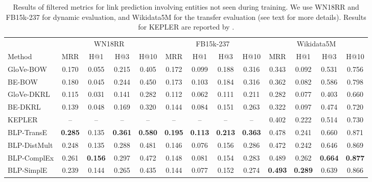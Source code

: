 \documentclass[sigconf]{acmart}
\let\mc\multicolumn
\begin{document}
\begin{table*}
\caption{Results of filtered metrics for link prediction involving entities not seen during training. We use WN18RR and FB15k-237 for dynamic evaluation, and Wikidata5M for the transfer evaluation (see text for more details). Results for KEPLER are reported by \citet{wang2019kepler}.}
\label{tab:results-inductive}
\centering
\begin{tabular}{lcccccccccccc}
\toprule
              &         \mc{4}{c}{WN18RR}                 &        \mc{4}{c}{FB15k-237}               &       \mc{4}{c}{Wikidata5M}               \\ 
                        \cmidrule(lr){2-5}                         \cmidrule(lr){6-9}                          \cmidrule(lr){10-13}                
Method        &    MRR   &     H@1  &     H@3  &     H@10 &    MRR   &     H@1  &     H@3  &     H@10 &    MRR   &     H@1  &     H@3  &     H@10 \\ 
\midrule                                                                                                                                          
GloVe-BOW     &    0.170 &    0.055 &    0.215 &    0.405 &    0.172 &    0.099 &    0.188 &    0.316 &    0.343 &    0.092 &    0.531 &    0.756 \\ 
BE-BOW        &    0.180 &    0.045 &    0.244 &    0.450 &    0.173 &    0.103 &    0.184 &    0.316 &    0.362 &    0.082 &    0.586 &    0.798 \\ 
GloVe-DKRL    &    0.115 &    0.031 &    0.141 &    0.282 &    0.112 &    0.062 &    0.111 &    0.211 &    0.282 &    0.077 &    0.403 &    0.660 \\ 
BE-DKRL       &    0.139 &    0.048 &    0.169 &    0.320 &    0.144 &    0.084 &    0.151 &    0.263 &    0.322 &    0.097 &    0.474 &    0.720 \\
KEPLER        &     --   &     --   &     --   &     --   &     --   &     --   &     --   &     --   &    0.402 &    0.222 &    0.514 &    0.730 \\
\midrule                                                                                                                                          
BLP-TransE    &\bf 0.285 &    0.135 &\bf 0.361 &\bf 0.580 &\bf 0.195 &\bf 0.113 &\bf 0.213 &\bf 0.363 &    0.478 &    0.241 &    0.660 &    0.871 \\ 
BLP-DistMult  &    0.248 &    0.135 &    0.288 &    0.481 &    0.146 &    0.076 &    0.156 &    0.286 &    0.472 &    0.242 &    0.646 &    0.869 \\ 
BLP-ComplEx   &    0.261 &\bf 0.156 &    0.297 &    0.472 &    0.148 &    0.081 &    0.154 &    0.283 &    0.489 &    0.262 &\bf 0.664 &\bf 0.877 \\ 
BLP-SimplE    &    0.239 &    0.144 &    0.265 &    0.435 &    0.144 &    0.077 &    0.152 &    0.274 &\bf 0.493 &\bf 0.289 &    0.639 &    0.866 \\
\bottomrule
\end{tabular}
\end{table*}
\end{document}
